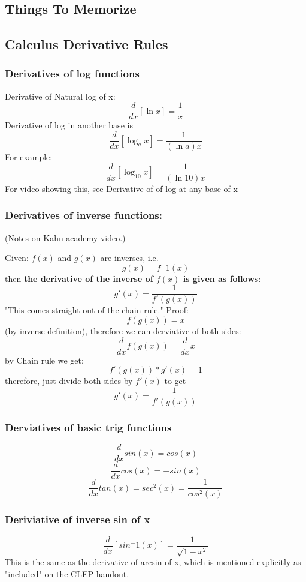\documentclass[12pt, letterpaper]{article}
\begin{document}
\subsection{Things To Memorize}
\subsection{Calculus Derivative Rules}
\subsubsection{Derivatives of log functions}
Derivative of Natural log of x:
\[\frac{d}{dx}[\ln x] = \frac{1}{x} \]
Derivative of log in another base is 
\[\frac{d}{dx}[\log_{a} x] = \frac{1}{(\ln a) x} \]
For example:
\[\frac{d}{dx}[\log_{10} x] = \frac{1}{(\ln 10) x} \]
For video showing this, see \href{https://www.khanacademy.org/math/in-in-grade-12-ncert/xd340c21e718214c5:continuity-differentiability/xd340c21e718214c5:logarithmic-functions-differentiation/v/logarithmic-functions-differentiation-intro}{Derivative of of log at any base of x}
\subsubsection{Derivatives of inverse functions:} 
(Notes on 
\href{https://www.khanacademy.org/math/differential-calculus/dc-chain/dc-inverse-func-diff/v/derivatives-of-inverse-functions-implicit?modal=1}{Kahn academy video}.)

Given: $f(x)$ and $g(x)$ are inverses, i.e. \[g(x) = f^-1(x)\]
then \textbf{the derivative of the inverse of $f(x)$ is given as follows}:
\[g'(x) = \frac{1}{f'(g(x))}\]
"This comes straight out of the chain rule."  Proof:
\[f(g(x)) = x\] 
(by inverse definition), therefore we can derviative of both sides:
\[ \frac{d}{dx} f(g(x)) = \frac{d}{dx} x\]
by Chain rule we get:
\[f'(g(x))*g'(x) = 1 \]
therefore, just divide both sides by $f'(x)$ to get
\[g'(x) = \frac{1}{f'(g(x))}\]
\subsubsection{Derviatives of basic trig functions}
\[\frac{d}{dx} sin(x) = cos(x)\]
\[\frac{d}{dx} cos(x) = -sin(x)\]
\[\frac{d}{dx} tan(x) = sec^2(x)= \frac{1}{cos^2(x)}\]
\subsubsection{Deriviative of inverse sin of x}
\[\frac{d}{dx}[sin^-1(x)] = \frac{1}{\sqrt{1 - x^2}}\]
This is the same as the derivative of arcsin of x, which is mentioned explicitly as "included" on the CLEP handout.
\end{document}
